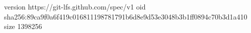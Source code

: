 version https://git-lfs.github.com/spec/v1
oid sha256:89ca9f0a6f419c016811198781791b6d8e9d53e3048b3b1ff0894c70b3d1a410
size 1398256
